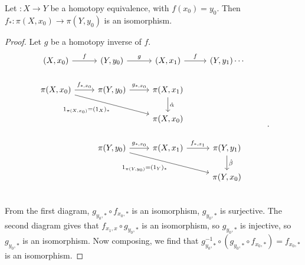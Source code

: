\begin{theorem}
    Let $: X \to Y$ be a homotopy equivalence, with $f(x_0) = y_0$.
    Then $f_*: \pi(X, x_0) \to \pi(Y, y_0)$ is an isomorphism.
\end{theorem}
\begin{proof}
    Let $g$ be a homotopy inverse of $f$.
    \[
     \begin{tikzcd}
         (X, x_0) \arrow[r, "f"]                             
         & (Y, y_0) \arrow[r, "g"] & (X, x_1) \arrow[r, "f"] & (Y, y_1) \cdots\\
         \pi(X, x_0) \arrow[drr, swap, "1_{\pi(X, x_0)} = (1_X)_*"] \arrow[r, "f_{*, x_0}"]
         & \pi(Y, y_0) \arrow[r, "g_{*, x_0}"] & \pi(X, x_1)\arrow[d, "\hat{\alpha}"]&& \\
         & & \pi(X, x_0) &&\\
         &\pi(Y, y_0) \arrow[drr, swap, "1_{\pi(Y, y_0)} = (1_Y)_*"] \arrow[r, "g_{*, x_0}"]
        & \pi(X, x_1) \arrow[r, "f_{*, x_1}"] & \pi(Y, y_1)\arrow[d, "\hat{\beta}"]& \\
        && & \pi(Y, x_0) &\\
     \end{tikzcd}
     .\] 
     From the first diagram, $g_{y_0, *}  \circ  f_{x_0, *}$ is an isomorphism, $g_{y_0, *}$ is surjective.
    The second diagram gives that $f_{x_1, x}  \circ  g_{y_0,*}$ is an isomorphism, so $g_{y_0, *}$ is injective, so $g_{y_0, *}$ is an isomorphism.
    Now composing, we find that $g_{y_0, *} ^{-1}  \circ  (g_{y_0, *}  \circ  f_{x_0, *}) = f_{x_0, *}$ is an isomorphism.
\end{proof}

\setcounter{section}{58}
